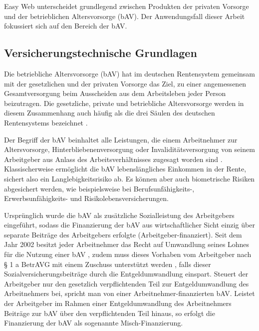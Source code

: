 Easy Web unterscheidet grundlegend zwischen Produkten der privaten Vorsorge und der betrieblichen Altersvorsorge (bAV). Der Anwendungsfall dieser Arbeit fokussiert sich auf den Bereich der bAV.

\subsection{Versicherungstechnische Grundlagen}\label{subsec:versicherungsgrundlagen}

Die betriebliche Altersvorsorge (bAV) hat im deutschen Rentensystem gemeinsam mit der gesetzlichen und der privaten Vorsorge das Ziel, zu \glqq einer angemessenen Gesamtversorgung beim Ausscheiden aus dem Arbeitsleben\grqq{} \cite[S. 12]{buttler2017einfuehrung} jeder Person beizutragen. Die gesetzliche, private und betriebliche Altersvorsorge werden in diesem Zusammenhang auch häufig als die drei Säulen des deutschen Rentensystems bezeichnet \cite[S. 3]{plato2016betriebliche}. 

Der Begriff der bAV beinhaltet \glqq alle Leistungen, die einem Arbeitnehmer zur Altersvorsorge, Hinterbliebenenversorgung oder Invaliditätsversorgung von seinem Arbeitgeber aus Anlass des Arbeitsverhältnisses zugesagt worden sind\grqq{} \cite[S. 1]{buttler2017einfuehrung}. Klassischerweise ermöglicht die bAV lebenslängliches Einkommen in der Rente, sichert also ein Langlebigkeitsrisiko ab. Es können aber auch biometrische Risiken abgesichert werden, wie beispielsweise bei Berufsunfähigkeits-, Erwerbsunfähigkeits- und Risikolebensversicherungen. 

Ursprünglich wurde die bAV als \glqq zusätzliche Sozialleistung des Arbeitgebers\grqq{} \cite[S. 7]{buttler2017einfuehrung} eingeführt, sodass die Finanzierung der bAV aus wirtschaftlicher Sicht einzig über separate Beiträge des Arbeitgebers erfolgte (Arbeitgeber-finanziert). Seit dem Jahr 2002 besitzt jeder Arbeitnehmer das Recht auf Umwandlung seines Lohnes für die Nutzung einer bAV \cite[S. 23]{buttler2017einfuehrung}, zudem muss dieses Vorhaben vom Arbeitgeber nach § 1 a BetrAVG mit einem Zuschuss unterstützt werden \cite[S. 29]{buttler2017einfuehrung}, falls dieser Sozialversicherungsbeiträge durch die Entgeldumwandlung einspart. Steuert der Arbeitgeber nur den gesetzlich verpflichtenden Teil zur Entgeldumwandlung des Arbeitnehmers bei, spricht man von einer Arbeitnehmer-finanzierten bAV. Leistet der Arbeitgeber im Rahmen einer Entgeldumwandlung des Arbeitnehmers Beiträge zur bAV über den verpflichtenden Teil hinaus, so erfolgt die Finanzierung der bAV als sogenannte Misch-Finanzierung.

